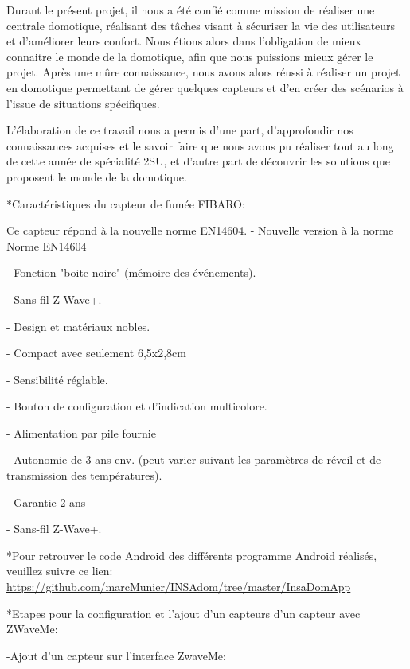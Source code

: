 Durant le présent projet, il nous a été confié comme mission de réaliser une centrale domotique, réalisant des tâches visant à sécuriser la vie des utilisateurs et d'améliorer leurs confort. Nous étions alors dans l'obligation de mieux connaitre le monde de la domotique, afin que nous puissions mieux gérer le projet. Après une mûre connaissance, nous avons alors réussi à réaliser un projet en domotique permettant de gérer quelques capteurs et d'en créer des scénarios à l'issue de situations spécifiques.\newline

L'élaboration de ce travail nous a permis d'une part, d'approfondir nos connaissances acquises et le savoir faire que nous avons pu réaliser tout au long de cette année de spécialité 2SU, et d'autre part de découvrir les solutions que proposent le monde de la domotique.\newline

*Caractéristiques du capteur de fumée FIBARO:

 
Ce capteur répond à la nouvelle norme EN14604. -    Nouvelle version à la norme Norme EN14604


-    Fonction "boite noire" (mémoire des événements).


-    Sans-fil Z-Wave+.


-    Design et matériaux nobles.


-    Compact avec seulement 6,5x2,8cm


-    Sensibilité réglable.


-    Bouton de configuration et d'indication multicolore.


-    Alimentation par pile fournie 


-    Autonomie de 3 ans env. (peut varier suivant les paramètres de réveil et de transmission des températures).


-    Garantie 2 ans


-    Sans-fil Z-Wave+.

*Pour retrouver le code Android des différents programme Android réalisés, veuillez suivre ce lien:  \url{https://github.com/marcMunier/INSAdom/tree/master/InsaDomApp}


*Etapes pour la configuration et l'ajout d'un capteurs d'un capteur avec ZWaveMe:


-Ajout d'un capteur sur l'interface ZwaveMe:


